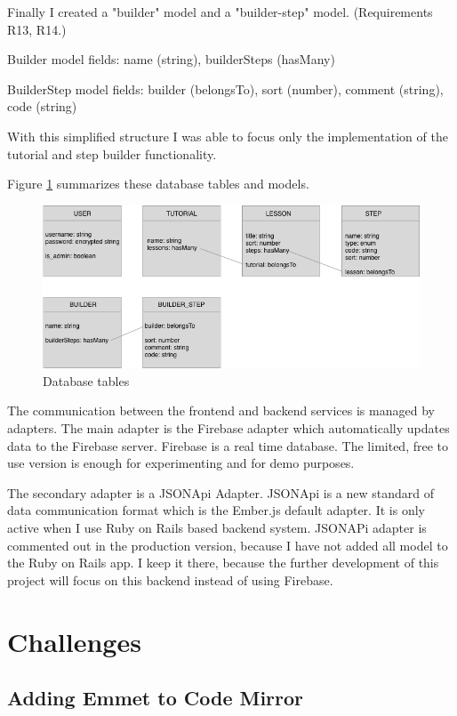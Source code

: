 \documentclass[11pt, a4paper, oneside, openright, medskipamount]{report}
\begin{document}
Finally I created a "builder" model and a "builder-step" model. (Requirements R13, R14.)

Builder model fields: name (string), builderSteps (hasMany)

BuilderStep model fields: builder (belongsTo), sort (number), comment (string), code (string)

With this simplified structure I was able to focus only the implementation of the tutorial and step builder functionality.

Figure \ref{fig:database-tables} summarizes these database tables and models.

\begin{figure}[htbp]
\centering
\includegraphics[width=1\textwidth]{assets/database-tables}
\caption{Database tables}
\label{fig:database-tables}
\end{figure}

The communication between the frontend and backend services is managed by adapters. The main adapter is the Firebase adapter which automatically updates data to the Firebase server. Firebase is a real time database. The limited, free to use version is enough for experimenting and for demo purposes.

The secondary adapter is a JSONApi Adapter. JSONApi \cite{jsonapi} is a new standard of data communication format which is the Ember.js default adapter. It is only active when I use Ruby on Rails based backend system. JSONAPi adapter is commented out in the production version, because I have not added all model to the Ruby on Rails app. I keep it there, because the further development of this project will focus on this backend instead of using Firebase.

\section{Challenges}

\subsection{Adding Emmet to Code Mirror} \label{emmet}
\end{document}

